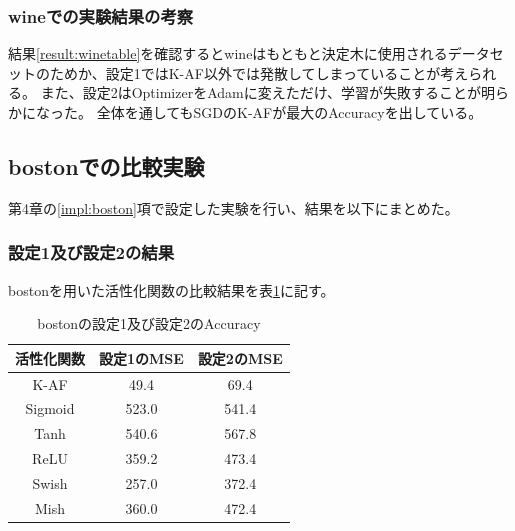 \subsubsection{wineでの実験結果の考察}
結果\ref{result:winetable}を確認するとwineはもともと決定木に使用されるデータセットのためか、設定1ではK-AF以外では発散してしまっていることが考えられる。
また、設定2はOptimizerをAdamに変えただけ、学習が失敗することが明らかになった。
全体を通してもSGDのK-AFが最大のAccuracyを出している。







\subsection{bostonでの比較実験}
\label{ev:bostonでの比較実験}

第4章の\ref{impl:boston}項で設定した実験を行い、結果を以下にまとめた。
\subsubsection{設定1及び設定2の結果}

bostonを用いた活性化関数の比較結果を表\ref{result:bostontable}に記す。


\begin{table}[htbp]
    \begin{center}
        \caption{bostonの設定1及び設定2のAccuracy}
        \label{result:bostontable}
        \vspace{2mm} 
        \begin{tabular}{|c|c|c|}
            \hline
            活性化関数              & 設定1のMSE &  設定2のMSE \\
            \hline
            K-AF            & 49.4 & 69.4 \\
            \hline
            Sigmoid            & 523.0 & 541.4 \\
            \hline
            Tanh            & 540.6 &  567.8 \\
            \hline
            ReLU        & 359.2 & 473.4 \\
            \hline
            Swish           & 257.0 & 372.4 \\
            \hline
            Mish           & 360.0 & 472.4 \\
            \hline
    
        \end{tabular}
    \end{center}
\end{table}


